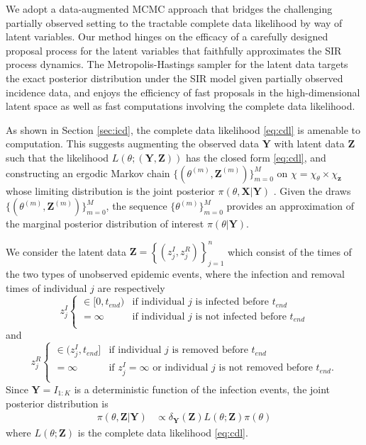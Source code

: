 \documentclass[12pt]{article}
\begin{document}
We adopt a data-augmented MCMC approach that bridges the challenging partially observed setting to the tractable complete data likelihood by way of latent variables. Our method hinges on the efficacy of a carefully designed proposal process for the latent variables that faithfully approximates the SIR process dynamics.
The Metropolis-Hastings sampler for the latent data targets the exact posterior distribution under the SIR model given partially observed incidence data, and enjoys the efficiency of fast proposals in the high-dimensional latent space as well as fast computations involving the complete data likelihood.

As shown in Section \ref{sec:icd}, the complete data likelihood \eqref{eq:cdl} is amenable to computation. This suggests augmenting the observed data $\mathbf{Y}$ with latent data $\mathbf{Z}$ such that the likelihood $L(\theta; (\mathbf{Y}, \mathbf{Z}))$ has the closed form \eqref{eq:cdl}, and constructing an ergodic Markov chain $\{(\theta^{(m)}, \mathbf{Z}^{(m)})\}_{m=0}^M$ on $\chi = \chi_{\theta} \times \chi_{\mathbf{z}}$ whose limiting distribution is the joint posterior $\pi(\theta, \mathbf{X}|\mathbf{Y})$ %
. Given the draws $\{(\theta^{(m)}, \mathbf{Z}^{(m)})\}_{m=0}^M$, the sequence $\{\theta^{(m)}\}_{m=0}^M$ provides an approximation of the marginal posterior distribution of interest $\pi(\theta|\mathbf{Y})$.

We consider the latent data $\mathbf{Z} = \left\lbrace (z^I_j, z^R_j)\right\rbrace_{j=1}^{n}$ which consist of the times of the two types of unobserved epidemic events, where the infection and removal times of individual $j$ are respectively
$$z^I_j \begin{cases}
	\in [0, t_{end}) & \text{if individual } j \text{ is infected before } t_{end} \\
	= \infty & \text{if individual } j \text{ is not infected before } t_{end} \\
\end{cases}$$
and
$$z^R_j \begin{cases}
	\in (z^I_j, t_{end}] & \text{if individual } j \text{ is removed before } t_{end} \\
	= \infty & \text{if } z^I_j = \infty \text{ or individual } j \text{ is not removed before } t_{end}. \\
\end{cases}$$
Since $\mathbf{Y} = I_{1:K}$ is a deterministic function of the infection events, the joint posterior distribution is
\begin{align*}
	\pi(\theta, \mathbf{Z}|\mathbf{Y})
	& \propto \delta_{\mathbf{Y}}(\mathbf{Z}) L(\theta; \mathbf{Z}) \pi(\theta)
\end{align*}
where $L(\theta; \mathbf{Z})$ is the complete data likelihood \eqref{eq:cdl}.
\end{document}
